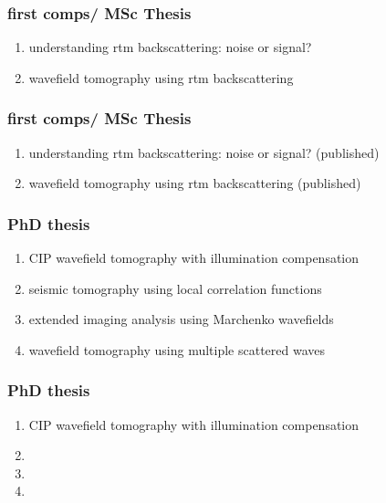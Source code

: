 \begin{frame}
\vspace{-2cm}
\end{frame}




\begin{frame} \frametitle{first comps/ MSc Thesis}
  \Large
  \begin{enumerate}
    \item understanding rtm backscattering: noise or signal?
    \item wavefield tomography using rtm backscattering
  \end{enumerate} 
\end{frame}


\begin{frame} \frametitle{first comps/ MSc Thesis}
  \Large

  \begin{enumerate}
    \item understanding rtm backscattering: noise or signal? (published)
    \item wavefield tomography using rtm backscattering (published)
  \end{enumerate} 
\end{frame}


\begin{frame} \frametitle{PhD thesis}
  \Large

  \begin{enumerate}
    \item CIP wavefield tomography with illumination compensation
    \item seismic tomography using local correlation functions
    \item extended imaging analysis using Marchenko wavefields
    \item wavefield tomography using multiple scattered waves
  \end{enumerate} 
\end{frame}


\begin{frame} \frametitle{PhD thesis}
  \Large

  \begin{enumerate}
    \item CIP wavefield tomography with illumination compensation
    \item {}
    \item {}
    \item {}
  \end{enumerate} 
\end{frame}







